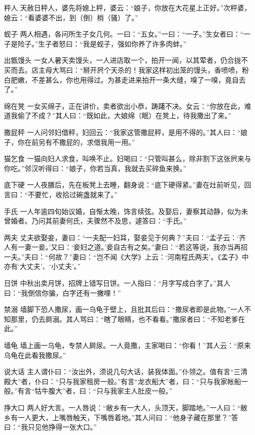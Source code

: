\documentclass[12pt,UTF8]{ctexbook}
\begin{document}
秤人
天赦日秤人，婆先将媳上秤，婆云：“娘子，你放在大花星上正好。”次秤婆，媳云：“看婆婆不出，到（倒）梢（骚）了。”

蚬子
两人相遇，各问所生子女几何。一曰：“五女。”一曰：“一子。”生女者曰：“一子是险子。”生子者怒曰：“我是蚬子，强如你养了许多肉蚌。”

出甑馒头
一女人暑天卖馒头，一人进店取一个，拍开一闻，以其荤者，仍合拢不买而去。店主母大骂曰：“掰开屄个天杀的！我家这样初出笼的馒头，香喷喷，粉白肥嫩，不差甚么，你也用得过。为甚走进来拍开一条大缝，嗅了一嗅，竟自去了。”

绵在凳
一女买绵子，正在讲价，卖者欲出小恭，踌躇不决。女云：“你放在此，难道我偷了不成？”其人曰：“既如此，大娘绵（眠）在凳上，待我撒出了来。”

撒屁秤
一人问邻妇借秤，妇回云：“我家这管撒屁秤，是用不得的。”其人曰：“娘子，你在前另有不撒屁的，求借我用一用。”

猫乞食
一猫向妇人求食，叫唤不止。妇喝曰：“只管叫甚么，除非割下这张屄来与你吃。”邻汉听得曰：“娘子，你若当真，我就去买碎鱼来换。”

底下硬
一人夜膳后，先在板凳上去睡，翻身说：“底下硬得紧。”妻在灶前听见，回言曰：“不要忙，收拾过碗盏就来了。”

手氏
一人年逾四旬始议婚，自惭太晚，饰言续弦。及娶后，妻察其动静，似为未曾婚者。乃问其前妻何氏，夫骤然不及思，遽答曰：“手氏。”

两夫
丈夫欲娶妾，妻曰：“一夫配一妇耳，娶妾见于何典？”夫曰：“孟子云：‘齐人有一妻一妾。’又曰：‘妾妇之道。’妾自古有之矣。”妻曰：“若这等说，我亦当再招一夫。”夫曰：“何故？”妻曰：“岂不闻《大学》上云：‘河南程氏两夫’。《孟子》中亦有‘大丈夫’、‘小丈夫’。”

日饼
中秋出卖月饼，招牌上错写日饼。一人指曰：“月字写成白字了。”其人曰：“我倒信你骗，白字还有一撇哩！”

禁溺
墙脚下恐人撒尿，画一乌龟于壁上，且批其后曰：“撒尿者即是此物。”一人不知那里，仍去屙溺。其人骂曰：“瞎了眼睛，也不看看。”撒尿者曰：“不知老爹在此。”

墙龟
墙上画一乌龟，专禁人屙尿。一人竟撒，主家喝曰：“你看！”其人云：“原来乌龟在此看我撒尿。”

说大话
主人谓仆曰：“汝出外，须说几句大话，装我体面。”仆领之。值有言“三清殿大”者，仆曰：“只与我家租房一般。”有言“龙衣船大”者，曰：“只与我家帐船一般。”有言“牯牛腹大”者，曰：“只与我家主人肚皮一般。”

挣大口
两人好大言。一人唇说：“敝乡有一大人，头顶天，脚踏地。”一人曰：“敝乡有一人更大，上嘴唇触天，下嘴唇着地。”其人问曰：“他身子藏在那里？”答曰：“我只见他挣得一张大口。”
\end{document}
